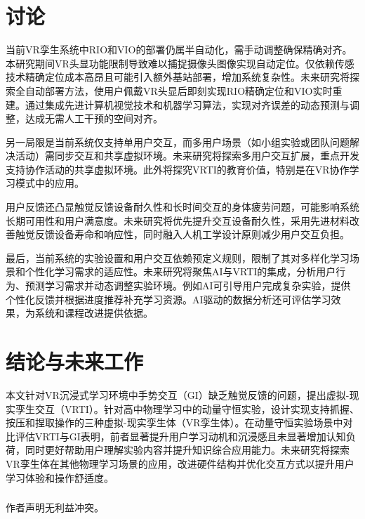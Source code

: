 \documentclass[runningheads]{llncs}
\begin{document}
\section{讨论}
当前VR孪生系统中RIO和VIO的部署仍属半自动化，需手动调整确保精确对齐。本研究期间VR头显功能限制导致难以捕捉摄像头图像实现自动定位。仅依赖传感技术精确定位成本高昂且可能引入额外基站部署，增加系统复杂性。未来研究将探索全自动部署方法，使用户佩戴VR头显后即刻实现RIO精确定位和VIO实时重建。通过集成先进计算机视觉技术和机器学习算法，实现对齐误差的动态预测与调整，达成无需人工干预的空间对齐。

另一局限是当前系统仅支持单用户交互，而多用户场景（如小组实验或团队问题解决活动）需同步交互和共享虚拟环境。未来研究将探索多用户交互扩展，重点开发支持协作活动的共享虚拟环境。此外将探究VRTI的教育价值，特别是在VR协作学习模式中的应用。

用户反馈还凸显触觉反馈设备耐久性和长时间交互的身体疲劳问题，可能影响系统长期可用性和用户满意度。未来研究将优先提升交互设备耐久性，采用先进材料改善触觉反馈设备寿命和响应性，同时融入人机工学设计原则减少用户交互负担。

最后，当前系统的实验设置和用户交互依赖预定义规则，限制了其对多样化学习场景和个性化学习需求的适应性。未来研究将聚焦AI与VRTI的集成，分析用户行为、预测学习需求并动态调整实验环境。例如AI可引导用户完成复杂实验，提供个性化反馈并根据进度推荐补充学习资源。AI驱动的数据分析还可评估学习效果，为系统和课程改进提供依据。

\section{结论与未来工作}
本文针对VR沉浸式学习环境中手势交互（GI）缺乏触觉反馈的问题，提出虚拟-现实孪生交互（VRTI）。针对高中物理学习中的动量守恒实验，设计实现支持抓握、按压和捏取操作的三种虚拟-现实孪生体（VR孪生体）。在动量守恒实验场景中对比评估VRTI与GI表明，前者显著提升用户学习动机和沉浸感且未显著增加认知负荷，同时更好帮助用户理解实验内容并提升知识综合应用能力。未来研究将探索VR孪生体在其他物理学习场景的应用，改进硬件结构并优化交互方式以提升用户学习体验和操作舒适度。

\begin{credits}
\subsubsection{\ackname} 

\subsubsection{\discintname}
作者声明无利益冲突。
\end{credits}



\end{document}
